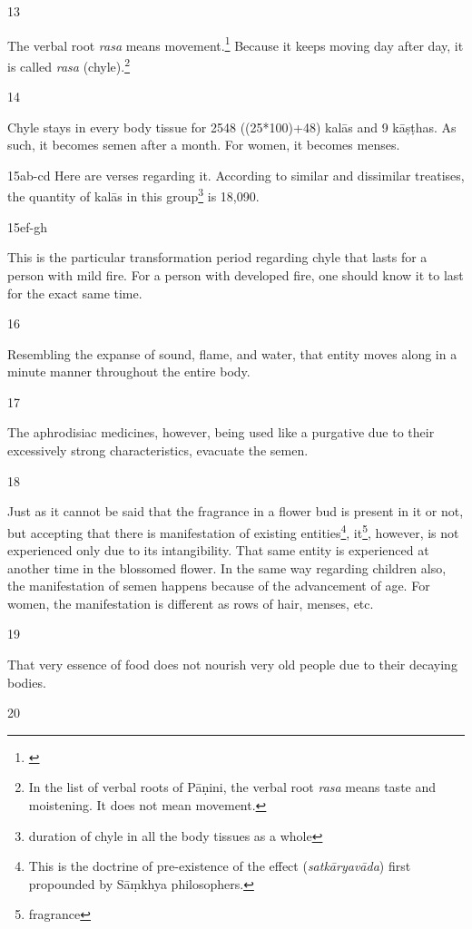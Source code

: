 \begin{translation}
\item[13]

The verbal root \emph{rasa} means movement.\footnote{\cite[109]{kunj-1907}} Because it keeps moving day after day, it is called \emph{rasa} (chyle).\footnote{In the list of verbal roots of Pāṇini, the verbal root \emph{rasa} means taste and moistening. It does not mean movement.}    

\item[14]

Chyle stays in every body tissue for 2548 ((25*100)+48) kalās and 9 kāṣṭhas. As such, it becomes semen after a month. For women, it becomes menses.  

\item[15ab-cd] Here are verses regarding it.
According to similar and dissimilar treatises, the quantity of kalās in this group\footnote{duration of chyle in all the body tissues as a whole} is 18,090.

\item[15ef-gh]

This is the particular transformation period regarding chyle that lasts for a person with mild fire. For a person with developed fire, one should know it to last for the exact same time.




\item[16]

Resembling the expanse of sound, flame, and water, that entity moves along in a minute manner throughout the  entire body.

\item[17]

The aphrodisiac medicines, however, being used like a purgative due to their excessively strong characteristics, evacuate the semen.      

\item[18]

Just as it cannot be said that the fragrance in a flower bud is present in it or not, but accepting that there is manifestation of existing entities\footnote{This is the doctrine of pre-existence of the effect (\textit{satkāryavāda}) first propounded by Sāṃkhya philosophers.}, it\footnote{fragrance}, however, is not experienced only due to its intangibility. That same entity is experienced at another time in the blossomed flower. In the same way regarding children also, the manifestation of semen happens because of the advancement of age. For women, the manifestation is different as rows of hair, menses, etc. 

\item[19]

That very essence of food does not nourish very old people due to their decaying bodies.

\item [20]


\end{translation}

